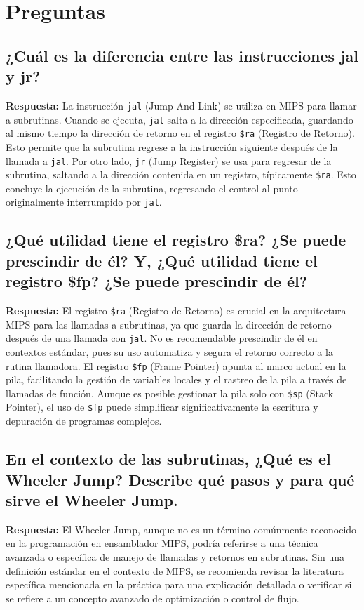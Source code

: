 \documentclass{article}
\begin{document}
\section{Preguntas}

\subsection{¿Cuál es la diferencia entre las instrucciones jal y jr?}
\textbf{Respuesta:} La instrucción \texttt{jal} (Jump And Link) se utiliza en MIPS para llamar a subrutinas. Cuando se ejecuta, \texttt{jal} salta a la dirección especificada, guardando al mismo tiempo la dirección de retorno en el registro \texttt{\$ra} (Registro de Retorno). Esto permite que la subrutina regrese a la instrucción siguiente después de la llamada a \texttt{jal}. Por otro lado, \texttt{jr} (Jump Register) se usa para regresar de la subrutina, saltando a la dirección contenida en un registro, típicamente \texttt{\$ra}. Esto concluye la ejecución de la subrutina, regresando el control al punto originalmente interrumpido por \texttt{jal}.

\subsection{¿Qué utilidad tiene el registro \$ra? ¿Se puede prescindir de él? Y, ¿Qué utilidad tiene el registro \$fp? ¿Se puede prescindir de él?}
\textbf{Respuesta:} El registro \texttt{\$ra} (Registro de Retorno) es crucial en la arquitectura MIPS para las llamadas a subrutinas, ya que guarda la dirección de retorno después de una llamada con \texttt{jal}. No es recomendable prescindir de él en contextos estándar, pues su uso automatiza y segura el retorno correcto a la rutina llamadora. El registro \texttt{\$fp} (Frame Pointer) apunta al marco actual en la pila, facilitando la gestión de variables locales y el rastreo de la pila a través de llamadas de función. Aunque es posible gestionar la pila solo con \texttt{\$sp} (Stack Pointer), el uso de \texttt{\$fp} puede simplificar significativamente la escritura y depuración de programas complejos.

\subsection{En el contexto de las subrutinas, ¿Qué es el Wheeler Jump? Describe qué pasos y para qué sirve el Wheeler Jump.}
\textbf{Respuesta:} El Wheeler Jump, aunque no es un término comúnmente reconocido en la programación en ensamblador MIPS, podría referirse a una técnica avanzada o específica de manejo de llamadas y retornos en subrutinas. Sin una definición estándar en el contexto de MIPS, se recomienda revisar la literatura específica mencionada en la práctica para una explicación detallada o verificar si se refiere a un concepto avanzado de optimización o control de flujo.
\end{document}
